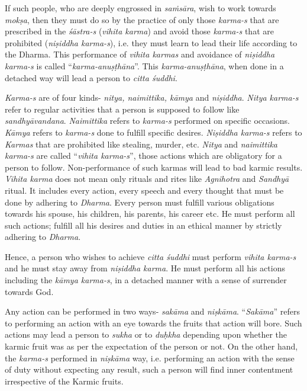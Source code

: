 If such people, who are deeply engrossed in \emph{saṁsāra}, wish to work towards \emph{mokṣa}, then they must do so by the practice of only those \emph{karma-s} that are prescribed in the \emph{śāstra-s} (\emph{vihita karma}) and avoid those \emph{karma-s} that are prohibited (\emph{niṣiddha karma-s}), i.e. they must learn to lead their life according to the Dharma. This performance of \emph{vihita karmas} and avoidance of \emph{niṣiddha karma-s} is called ``\emph{karma-anuṣṭhāna}''. This \emph{karma-anuṣṭhāna}, when done in a detached way will lead a person to \emph{citta śuddhi}.

\emph{Karma-s} are of four kinds- \emph{nitya, naimittika, kāmya} and \emph{niṣiddha}. \emph{Nitya karma-s} refer to regular activities that a person is supposed to follow like \emph{sandhyāvandana}. \emph{Naimittika} refers to \emph{karma-s} performed on specific occasions. \emph{Kāmya} refers to \emph{karma-s} done to fulfill specific desires. \emph{Niṣiddha karma-s} refers to \emph{Karmas} that are prohibited like stealing, murder, etc. \emph{Nitya} and \emph{naimittika} \emph{karma-s} are called ``\emph{vihita karma-s}'', those actions which are obligatory for a person to follow. Non-performance of such karmas will lead to bad karmic results. \emph{Vihita karma} does not mean only rituals and rites like \emph{Agnihotra} and \emph{Sandhyā} ritual. It includes every action, every speech and every thought that must be done by adhering to \emph{Dharma}. Every person must fulfill various obligations towards his spouse, his children, his parents, his career etc. He must perform all such actions; fulfill all his desires and duties in an ethical manner by strictly adhering to \emph{Dharma}.

Hence, a person who wishes to achieve \emph{citta śuddhi} must perform \emph{vihita karma-s} and he must stay away from \emph{niṣiddha karma}. He must perform all his actions including the \emph{kāmya karma-s}, in a detached manner with a sense of surrender towards God.

Any action can be performed in two ways- \emph{sakāma} and \emph{niṣkāma}. ``\emph{Sakāma}'' refers to performing an action with an eye towards the fruits that action will bore. Such actions may lead a person to \emph{sukha} or to \emph{duḥkha} depending upon whether the karmic fruit was as per the expectation of the person or not. On the other hand, the \emph{karma-s} performed in \emph{niṣkāma} way, i.e. performing an action with the sense of duty without expecting any result, such a person will find inner contentment irrespective of the Karmic fruits.

